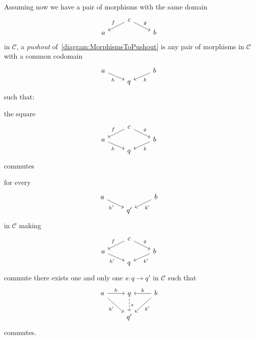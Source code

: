 \begin{definition}
  Assuming now we have a pair of morphisms with the same domain
  \begin{equation}
    \begin{tikzcd}[row sep=tiny]
      & c \ar["f", dl, swap] \ar["g", dr] & \\
      a & & b
    \end{tikzcd}
    \label{diagram:MorphismsToPushout}
  \end{equation}
  in \(\mathcal{C}\), a {\em pushout} of~\eqref{diagram:MorphismsToPushout} is any
  pair of morphisms in \(\mathcal{C}\) with a common codomain
  \[
    \begin{tikzcd}[row sep=tiny]
      a \ar["h", dr, swap] & & b \ar["k", dl] \\
      & q &
    \end{tikzcd}
  \]
  such that:
  \begin{tcbitem}
  \item the square
    \[
      \begin{tikzcd}[row sep=tiny]
        & c \ar["f", dl, swap] \ar["g", dr] &                \\
        a \ar["h", dr, swap] &                                   & b \ar["k", dl] \\
        & q &
      \end{tikzcd}
    \] commutes
  \item for every
    \[
      \begin{tikzcd}[row sep=tiny]
        a \ar["{h'}", dr, swap] & & b \ar["{k'}", dl] \\
        & q' &
      \end{tikzcd}
    \]
    in \(\mathcal{C}\) making
    \[
      \begin{tikzcd}[row sep=tiny]
        & c \ar["f", dl, swap] \ar["g", dr] &                \\
        a \ar["{h'}", dr, swap] &                                   & b \ar["{k'}", dl] \\
        & q &
      \end{tikzcd}
    \]
    commute there exists one and only one \(s : q \to q'\) in
    \(\mathcal{C}\) such that
    \[
      \begin{tikzcd}
        a \ar["h", r] \ar["{h'}", dr, swap] & q \ar["s", d, dashed] & b \ar["k", l, swap] \ar["{k'}", dl] \\
        & q' &
      \end{tikzcd}
    \]
    commutes.
  \end{tcbitem}
\end{definition}

